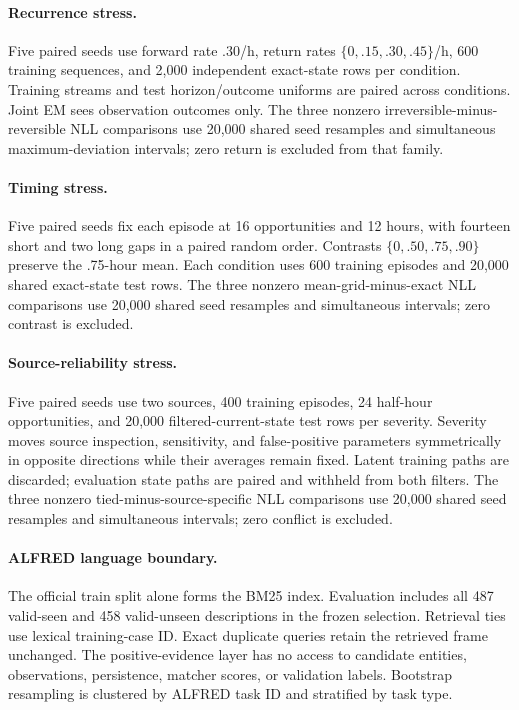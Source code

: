 \documentclass{article}
\begin{document}
\paragraph{Recurrence stress.}
Five paired seeds use forward rate .30/h, return rates $\{0,.15,.30,.45\}$/h, 600 training sequences, and 2,000 independent exact-state rows per condition. Training streams and test horizon/outcome uniforms are paired across conditions. Joint EM sees observation outcomes only. The three nonzero irreversible-minus-reversible NLL comparisons use 20,000 shared seed resamples and simultaneous maximum-deviation intervals; zero return is excluded from that family.

\paragraph{Timing stress.}
Five paired seeds fix each episode at 16 opportunities and 12 hours, with fourteen short and two long gaps in a paired random order. Contrasts $\{0,.50,.75,.90\}$ preserve the .75-hour mean. Each condition uses 600 training episodes and 20,000 shared exact-state test rows. The three nonzero mean-grid-minus-exact NLL comparisons use 20,000 shared seed resamples and simultaneous intervals; zero contrast is excluded.

\paragraph{Source-reliability stress.}
Five paired seeds use two sources, 400 training episodes, 24 half-hour opportunities, and 20,000 filtered-current-state test rows per severity. Severity moves source inspection, sensitivity, and false-positive parameters symmetrically in opposite directions while their averages remain fixed. Latent training paths are discarded; evaluation state paths are paired and withheld from both filters. The three nonzero tied-minus-source-specific NLL comparisons use 20,000 shared seed resamples and simultaneous intervals; zero conflict is excluded.

\paragraph{ALFRED language boundary.}
The official train split alone forms the BM25 index. Evaluation includes all 487 valid-seen and 458 valid-unseen descriptions in the frozen selection. Retrieval ties use lexical training-case ID. Exact duplicate queries retain the retrieved frame unchanged. The positive-evidence layer has no access to candidate entities, observations, persistence, matcher scores, or validation labels. Bootstrap resampling is clustered by ALFRED task ID and stratified by task type.
\end{document}
